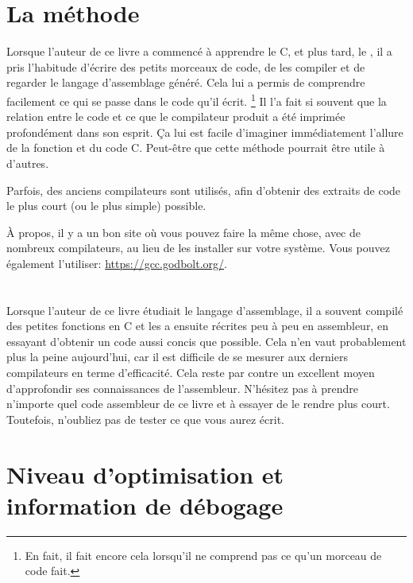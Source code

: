 ﻿\section{La méthode}

Lorsque l'auteur de ce livre a commencé à apprendre le C, et plus tard, le \Cpp, il a pris l'habitude d'écrire des petits morceaux de
code, de les compiler et de regarder le langage d'assemblage généré.
Cela lui a permis de comprendre facilement ce qui se passe dans le code qu'il écrit.
\footnote{En fait, il fait encore cela lorsqu'il ne comprend pas ce qu'un morceau de code fait.}
Il l'a fait si souvent que la relation entre le code \Cpp et ce que le compilateur produit a été imprimée profondément dans son
 esprit.
Ça lui est facile d'imaginer immédiatement l'allure de la fonction et du code C.
Peut-être que cette méthode pourrait être utile à d'autres.


Parfois, des anciens compilateurs sont utilisés, afin d'obtenir des extraits de code le plus court (ou le plus simple) possible.

À propos, il y a un bon site où vous pouvez faire la même chose, avec de nombreux
compilateurs, au lieu de les installer sur votre système.
Vous pouvez également l'utiliser: \url{https://gcc.godbolt.org/}.

\section*{\Exercises}

Lorsque l'auteur de ce livre étudiait le langage d'assemblage, il a souvent compilé des petites fonctions en C et les a ensuite
récrites peu à peu en assembleur, en essayant d'obtenir un code aussi concis que possible.
Cela n'en vaut probablement plus la peine aujourd'hui, car il est difficile
de se mesurer aux derniers compilateurs en terme d'efficacité. Cela reste par contre un excellent moyen d'approfondir ses connaissances
de l'assembleur.
N'hésitez pas à prendre n'importe quel code assembleur de ce livre et à essayer de le rendre plus court.
Toutefois, n'oubliez pas de tester ce que vous aurez écrit.

\section*{Niveau d'optimisation et information de débogage}

